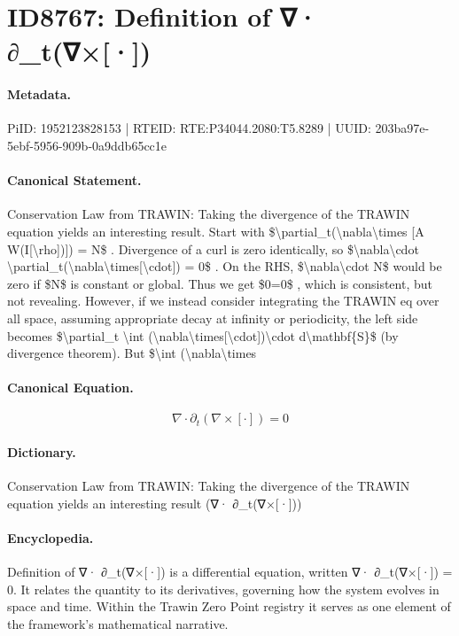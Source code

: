 \section*{ID8767: Definition of ∇· ∂\_t(∇×[·])}
\paragraph{Metadata.}
PiID: 1952123828153 | RTEID: RTE:P34044.2080:T5.8289 | UUID: 203ba97e-5ebf-5956-909b-0a9ddb65cc1e

\paragraph{Canonical Statement.}
Conservation Law from TRAWIN: Taking the divergence of the TRAWIN equation yields an interesting result. Start with \$\textbackslash{}partial\_t(\textbackslash{}nabla\textbackslash{}times [A W(I[\textbackslash{}rho])]) = N\$ . Divergence of a curl is zero identically, so \$\textbackslash{}nabla\textbackslash{}cdot \textbackslash{}partial\_t(\textbackslash{}nabla\textbackslash{}times[\textbackslash{}cdot]) = 0\$ . On the RHS, \$\textbackslash{}nabla\textbackslash{}cdot N\$ would be zero if \$N\$ is constant or global. Thus we get \$0=0\$ , which is consistent, but not revealing. However, if we instead consider integrating the TRAWIN eq over all space, assuming appropriate decay at infinity or periodicity, the left side becomes \$\textbackslash{}partial\_t \textbackslash{}int (\textbackslash{}nabla\textbackslash{}times[\textbackslash{}cdot])\textbackslash{}cdot d\textbackslash{}mathbf\{S\}\$ (by divergence theorem). But \$\textbackslash{}int (\textbackslash{}nabla\textbackslash{}times

\paragraph{Canonical Equation.}
\[
\nabla\cdot \partial_t(\nabla\times[\cdot]) = 0
\]

\paragraph{Dictionary.}
Conservation Law from TRAWIN: Taking the divergence of the TRAWIN equation yields an interesting result (∇· ∂\_t(∇×[·]))

\paragraph{Encyclopedia.}
Definition of ∇· ∂\_t(∇×[·]) is a differential equation, written ∇· ∂\_t(∇×[·]) = 0. It relates the quantity to its derivatives, governing how the system evolves in space and time. Within the Trawin Zero Point registry it serves as one element of the framework's mathematical narrative.
